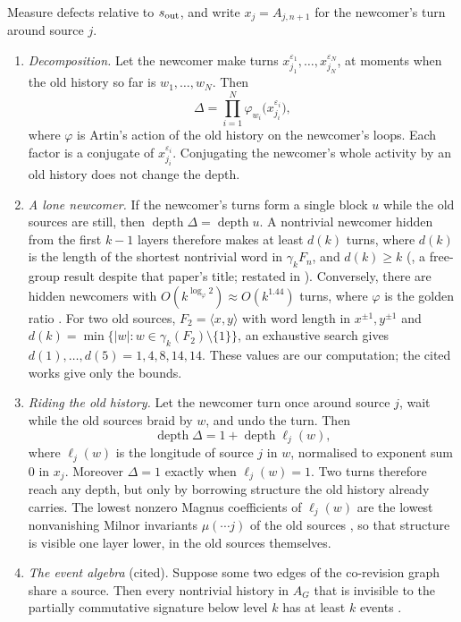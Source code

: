 \documentclass[11pt]{article}
\theoremstyle{definition}\newtheorem{definition}[theorem]{Definition}\newtheorem{remark}[theorem]{Remark}\newtheorem{example}[theorem]{Example}\newtheorem{problem}[theorem]{Open problem}\crefname{problem}{Problem}{Problems}
\begin{document}
\begin{proposition}[masking]\label{prop:masking}
Measure defects relative to $s_{\rm out}$, and write $x_j=A_{j,n+1}$ for the newcomer's turn around source $j$.
\begin{enumerate}
\item[(i)] \emph{Decomposition.} Let the newcomer make turns $x_{j_1}^{\varepsilon_1},\dots,x_{j_N}^{\varepsilon_N}$, at moments when the old history so far is $w_1,\dots,w_N$. Then
\[
\Delta=\prod_{i=1}^N\varphi_{w_i}\big(x_{j_i}^{\varepsilon_i}\big),
\]
where $\varphi$ is Artin's action of the old history on the newcomer's loops. Each factor is a conjugate of $x_{j_i}^{\varepsilon_i}$. Conjugating the newcomer's whole activity by an old history does not change the depth.
\item[(ii)] \emph{A lone newcomer.} If the newcomer's turns form a single block $u$ while the old sources are still, then $\operatorname{depth}\Delta=\operatorname{depth}u$. A nontrivial newcomer hidden from the first $k-1$ layers therefore makes at least $d(k)$ turns, where $d(k)$ is the length of the shortest nontrivial word in $\gamma_kF_n$, and $d(k)\ge k$ (\cite[Thm.~1.2]{MalesteinPutman2010}, a free-group result despite that paper's title; restated in \cite{MalesteinPutman2023}). Conversely, there are hidden newcomers with $O(k^{\log_\varphi2})\approx O(k^{1.44})$ turns, where $\varphi$ is the golden ratio \cite{ElkasapyThom2013,Elkasapy2016}. For two old sources, $F_2=\langle x,y\rangle$ with word length in $x^{\pm1},y^{\pm1}$ and $d(k)=\min\{|w|:w\in\gamma_k(F_2)\setminus\{1\}\}$, an exhaustive search gives $d(1),\dots,d(5)=1,4,8,14,14$. These values are our computation; the cited works give only the bounds.
\item[(iii)] \emph{Riding the old history.} Let the newcomer turn once around source $j$, wait while the old sources braid by $w$, and undo the turn. Then
\[
\operatorname{depth}\Delta=1+\operatorname{depth}\ell_j(w),
\]
where $\ell_j(w)$ is the longitude of source $j$ in $w$, normalised to exponent sum $0$ in $x_j$. Moreover $\Delta=1$ exactly when $\ell_j(w)=1$. Two turns therefore reach any depth, but only by borrowing structure the old history already carries. The lowest nonzero Magnus coefficients of $\ell_j(w)$ are the lowest nonvanishing Milnor invariants $\mu(\cdots j)$ of the old sources \cite{Milnor1954,HabeggerLin1990}, so that structure is visible one layer lower, in the old sources themselves.
\item[(iv)] \emph{The event algebra} (cited). Suppose some two edges of the co-revision graph share a source. Then every nontrivial history in $A_G$ that is invisible to the partially commutative signature below level $k$ has at least $k$ events \cite{MalesteinPutman2023}.
\end{enumerate}
\end{proposition}
\end{document}
